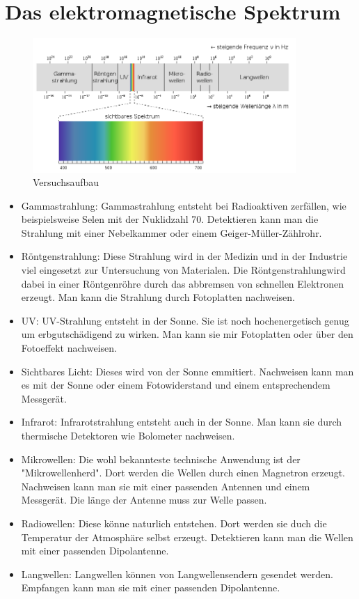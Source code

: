

\section{Das elektromagnetische Spektrum}


\begin{figure}[h]
    \begin{center}
        \includegraphics[width=10cm]{Bilder/Emspekt.PNG}
    \end{center}
    \caption{Versuchsaufbau}
   \end{figure}

\begin{itemize}
    \item Gammastrahlung: Gammastrahlung entsteht bei Radioaktiven zerfällen, wie beispielsweise Selen mit der Nuklidzahl 70. Detektieren kann man die Strahlung mit einer Nebelkammer oder einem Geiger-Müller-Zählrohr.
    \item Röntgenstrahlung: Diese Strahlung wird in der Medizin und in der Industrie viel eingesetzt zur Untersuchung von Materialen. Die Röntgenstrahlungwird dabei in einer Röntgenröhre durch das abbremsen von schnellen Elektronen erzeugt. Man kann die Strahlung durch Fotoplatten nachweisen.
    \item UV: UV-Strahlung entsteht in der Sonne. Sie ist noch hochenergetisch genug um erbgutschädigend zu wirken. Man kann sie mir Fotoplatten oder über den Fotoeffekt nachweisen.
    \item Sichtbares Licht: Dieses wird von der Sonne emmitiert. Nachweisen kann man es mit der Sonne oder einem Fotowiderstand und einem entsprechendem Messgerät.
    \item Infrarot: Infrarotstrahlung entsteht auch in der Sonne. Man kann sie durch thermische Detektoren wie Bolometer nachweisen.
    \item Mikrowellen: Die wohl bekannteste technische Anwendung ist der "Mikrowellenherd". Dort werden die Wellen durch einen Magnetron erzeugt. Nachweisen kann man sie mit einer passenden Antennen und einem Messgerät. Die länge der Antenne muss zur Welle passen.
    \item Radiowellen: Diese könne naturlich entstehen. Dort werden sie duch die Temperatur der Atmosphäre selbst erzeugt. Detektieren kann man die Wellen mit einer passenden Dipolantenne.
    \item Langwellen: Langwellen können von Langwellensendern gesendet werden. Empfangen kann man sie mit einer passenden Dipolantenne.
\end{itemize}